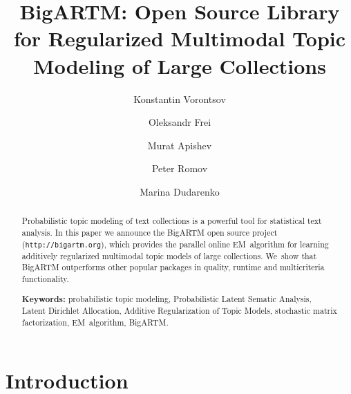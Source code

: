 \documentclass[russian,english]{llncs}
\begin{document}
\title{
    BigARTM: Open Source Library for
    Regularized Multimodal %
    Topic Modeling of Large Collections
}
\author{
    Konstantin Vorontsov
    \and
    Oleksandr Frei
    \and
    Murat Apishev
    \and
    Peter Romov
    \and
    Marina Dudarenko
}

\maketitle

\begin{abstract}
Probabilistic topic modeling of text collections is a powerful tool for statistical text analysis.
In this paper we announce the \mbox{BigARTM} open source project (\texttt{http://bigartm.org}),
which provides the parallel online EM~algorithm 
for learning additively regularized multimodal topic models of large collections.
We~show that BigARTM outperforms other popular packages in quality, runtime and multicriteria functionality. 

\vspace{1em}
\textbf{Keywords:}
    probabilistic topic modeling,
    Probabilistic Latent Sematic Analysis,
    Latent Dirichlet Allocation,
    Additive Regularization of Topic Models,
    stochastic matrix factorization,
    EM~algorithm,
    BigARTM.
\end{abstract}

\section{Introduction}
\end{document}
